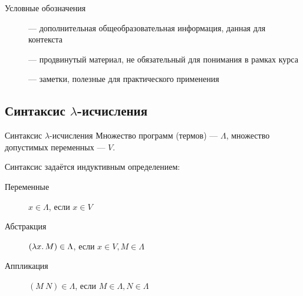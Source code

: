     \begin{frame}[fragile]{Условные обозначения}
        \begin{description}
            \item [\popslide] --- дополнительная общеобразовательная информация, данная для контекста
            \item [\advancedslide] --- продвинутый материал, не обязательный для понимания в рамках курса
            \item[\practicalslide] --- заметки, полезные для практического применения
        \end{description}
    \end{frame}


    \subsection{Синтаксис $\lambda$-исчисления}

    \begin{frame}{Синтаксис $\lambda$-исчисления}
        \pause
        Множество программ (термов) --- $\Lambda$, множество допустимых переменных --- $V$.

        Синтаксис задаётся индуктивным определением:
        \begin{description}
            \item[Переменные] $x \in \Lambda$, если $x \in V$ \hspace{2em}
            \pause
            \item[Абстракция] $(\lambda x\ldotp M) \in \Lambda$, если $x \in V, M \in \Lambda$ \hspace{2em}
            \pause
            \item[Аппликация] $(M~N) \in \Lambda$, если $M \in \Lambda, N \in \Lambda$ \hspace{2em}
        \end{description}
    \end{frame}

